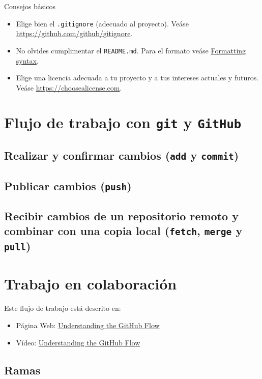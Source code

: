 \documentclass[xcolor={usenames,svgnames,dvipsnames}]{beamer}
\begin{document}
\begin{frame}[label={sec:org0932a75},fragile]{Consejos básicos}
 \begin{itemize}
\item Elige bien el \texttt{.gitignore} (adecuado al proyecto). Veáse \url{https://github.com/github/gitignore}.
\item No olvides cumplimentar el \texttt{README.md}. Para el formato veáse \href{https://help.github.com/articles/basic-writing-and-formatting-syntax/}{Formatting syntax}.
\item Elige una licencia adecuada a tu proyecto y a tus intereses actuales y futuros. Veáse \url{https://choosealicense.com}.
\end{itemize}
\end{frame}

\section{Flujo de trabajo con \texttt{git} y \texttt{GitHub}}
\label{sec:org32e96ad}
\subsection{Realizar y confirmar cambios (\texttt{add} y \texttt{commit})}
\label{sec:org1ceedb2}
\subsection{Publicar cambios (\texttt{push})}
\label{sec:org0d9aa5a}
\subsection{Recibir cambios de un repositorio remoto y combinar con una copia local (\texttt{fetch}, \texttt{merge} y \texttt{pull})}
\label{sec:org628af20}
\section{Trabajo en colaboración}
\label{sec:org31ccadc}
Este flujo de trabajo está descrito en:  
\begin{itemize}
\item Página Web: \href{https://guides.github.com/introduction/flow/}{Understanding the GitHub Flow}
\item Vídeo: \href{https://youtu.be/PBI2Rz-ZOxU}{Understanding the GitHub Flow}
\end{itemize}


\subsection{Ramas}
\label{sec:org873b836}
\end{document}

